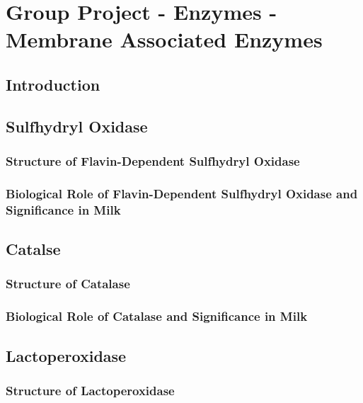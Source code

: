 \chapter{Group Project - Enzymes - Membrane Associated Enzymes}
\setlength{\headheight}{12.71342pt}
\addtolength{\topmargin}{-0.71342pt}


\section{Introduction}


\section{Sulfhydryl Oxidase}


\subsection*{Structure of Flavin-Dependent Sulfhydryl Oxidase}


\subsection*{Biological Role of Flavin-Dependent Sulfhydryl Oxidase and Significance in Milk}

\cite*{RM_01}

\section{Catalse}


\subsection*{Structure of Catalase}


\subsection*{Biological Role of Catalase and Significance in Milk}


\section{Lactoperoxidase}


\subsection*{Structure of Lactoperoxidase}


